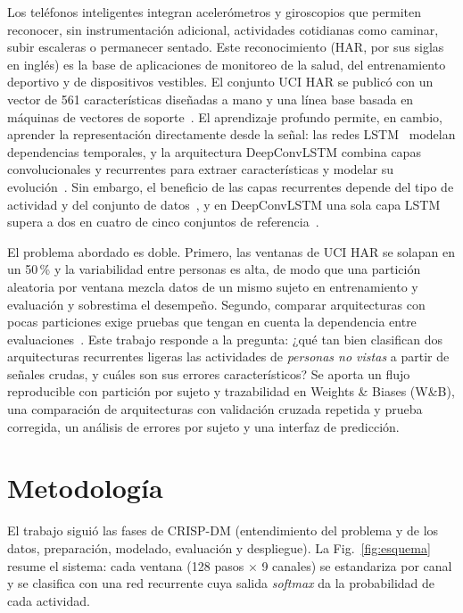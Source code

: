 \documentclass[runningheads]{llncs}
\begin{document}
Los teléfonos inteligentes integran acelerómetros y giroscopios que permiten
reconocer, sin instrumentación adicional, actividades cotidianas como caminar,
subir escaleras o permanecer sentado. Este reconocimiento (HAR, por sus siglas
en inglés) es la base de aplicaciones de monitoreo de la salud, del
entrenamiento deportivo y de dispositivos vestibles. El conjunto UCI HAR se
publicó con un vector de 561 características diseñadas a mano y una línea base
basada en máquinas de vectores de soporte~\cite{anguita2013}. El aprendizaje
profundo permite, en cambio, aprender la representación directamente desde la
señal: las redes LSTM~\cite{hochreiter1997} modelan dependencias temporales, y
la arquitectura DeepConvLSTM combina capas convolucionales y recurrentes para
extraer características y modelar su evolución~\cite{ordonez2016}. Sin embargo,
el beneficio de las capas recurrentes depende del tipo de actividad y del
conjunto de datos~\cite{hammerla2016}, y en DeepConvLSTM una sola capa LSTM
supera a dos en cuatro de cinco conjuntos de referencia~\cite{bock2022}.

El problema abordado es doble. Primero, las ventanas de UCI HAR se solapan en un
50\,\% y la variabilidad entre personas es alta, de modo que una partición
aleatoria por ventana mezcla datos de un mismo sujeto en entrenamiento y
evaluación y sobrestima el desempeño. Segundo, comparar arquitecturas con pocas
particiones exige pruebas que tengan en cuenta la dependencia entre
evaluaciones~\cite{nadeau2003}. Este trabajo responde a la pregunta: ¿qué tan
bien clasifican dos arquitecturas recurrentes ligeras las actividades de
\emph{personas no vistas} a partir de señales crudas, y cuáles son sus errores
característicos? Se aporta un flujo reproducible con partición por sujeto y
trazabilidad en Weights \& Biases (W\&B), una comparación de arquitecturas con
validación cruzada repetida y prueba corregida, un análisis de errores por sujeto
y una interfaz de predicción.

\section{Metodología}

El trabajo siguió las fases de CRISP-DM (entendimiento del problema y de los
datos, preparación, modelado, evaluación y despliegue). La
Fig.~\ref{fig:esquema} resume el sistema: cada ventana (128 pasos $\times$ 9
canales) se estandariza por canal y se clasifica con una red recurrente cuya
salida \emph{softmax} da la probabilidad de cada actividad.
\end{document}
